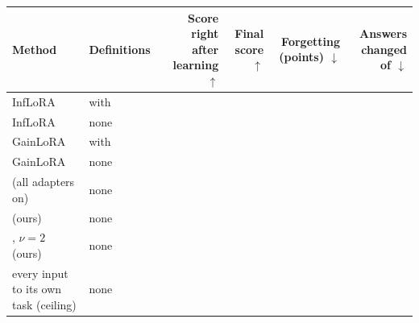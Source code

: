 {\footnotesize\setlength{\tabcolsep}{3pt}\begin{tabular}{p{1.9in}lrrrr}
    \toprule
    Method & Definitions & \shortstack[r]{Score right\\after\\learning $\uparrow$} & \shortstack[r]{Final\\score $\uparrow$} & \shortstack[r]{Forgetting\\(points) $\downarrow$} & \shortstack[r]{Answers\\changed\\of \AudPubCompared{} $\downarrow$} \\
    \midrule
    InfLoRA & with & \AudPubInfloraDefLearned{} & \AudPubInfloraDefAP{} & \AudPubInfloraDefFT{} & \AudPubInfloraDefChanged{} \\
    InfLoRA & none & \AudPubInfloraNoDefLearned{} & \AudPubInfloraNoDefAP{} & \AudPubInfloraNoDefFT{} & \AudPubInfloraNoDefChanged{} \\
    GainLoRA & with & \AudPubGainloraDefLearned{} & \AudPubGainloraDefAP{} & \AudPubGainloraDefFT{} & \AudPubGainloraDefChanged{} \\
    GainLoRA & none & \AudPubGainloraNoDefLearned{} & \AudPubGainloraNoDefAP{} & \AudPubGainloraNoDefFT{} & \AudPubGainloraNoDefChanged{} \\
    \midrule
    \plain{} (all adapters on) & none & \AudOursAllLearned{} & \AudOursAllAP{} & \AudOursAllFT{} & \AudOursAllChanged{} \\
    \recog{} (ours) & none & \AudOursRidgeLearned{} & \AudOursRidgeAP{} & \AudOursRidgeFT{} & \AudOursRidgeChanged{} \\
    \handicap{}, $\nu = 2$ (ours) & none & \AudOursHandicapLearned{} & \AudOursHandicapAP{} & \AudOursHandicapFT{} & \AudOursHandicapChanged{} \\
    every input to its own task (ceiling) & none & \AudOursOwnLearned{} & \AudOursOwnAP{} & \AudOursOwnFT{} & \AudOursOwnChanged{} \\
    \bottomrule
\end{tabular}}
